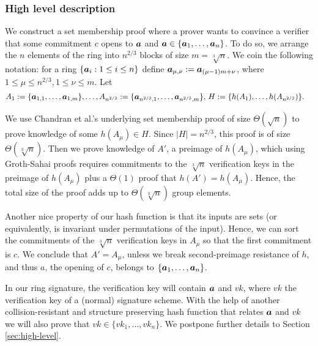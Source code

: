 \subsubsection{High level description}
We construct a set membership proof where a prover wants to convince a verifier that some commitment $c$ opens to ${\boldsymbol{a}}$ and ${\boldsymbol{a}}\in\{{\boldsymbol{a}}_1,\ldots,{\boldsymbol{a}}_n\}$. To do so, we arrange the $n$ elements of the ring into $n^{2/3}$ blocks of size $m=\sqrt[3]{n}$. We coin the following notation: for a ring $\{{\boldsymbol{a}}_i:1\leq i \leq n\}$ define ${\boldsymbol{a}}_{\mu,\nu}:={\boldsymbol{a}}_{(\mu-1)m+\nu}$, where  $1\leq\mu\leq n^{2/3},1\leq \nu\leq m$.  Let
\begin{align*}
& A_1 := \{{\boldsymbol{a}}_{1,1},\ldots,{\boldsymbol{a}}_{1,m}\},\ldots, A_{n^{2/3}} := \{{\boldsymbol{a}}_{n^{2/3},1},\ldots,{\boldsymbol{a}}_{n^{2/3},m}\},\,
H:=\{h(A_1),\ldots,\allowbreak h(A_{n^{2/3}})\}.
\end{align*}

We use Chandran et al.'s underlying set membership proof of size $\Theta(\sqrt{n})$ to prove knowledge of some $h(A_\mu)\in H$. Since $|H|=n^{2/3}$, this proof is of size $\Theta(\sqrt[3]{n})$. Then we prove knowledge of $A'$, a preimage of $h(A_\mu)$, which using Groth-Sahai proofs requires commitments to the $\sqrt[3]{n}$ verification keys in the preimage of $h(A_\mu)$ plus a $\Theta(1)$ proof that $h(A')=h(A_\mu)$. Hence, the total size of the proof adds up to $\Theta(\sqrt[3]{n})$ group elements.

Another nice property of our hash function is that its inputs are sets (or equivalently, is invariant under permutations of the input). Hence, we can sort the commitments of the $\sqrt[3]{n}$ verification keys in $A_\mu$ so that the first commitment is $c$. We conclude that $A'=A_\mu$, unless we break second-preimage resistance of $h$, and thus $a$, the opening of $c$, belongs to $\{{\boldsymbol{a}}_1,\ldots,{\boldsymbol{a}}_n\}$.

In our ring signature, the verification key will contain ${\boldsymbol{a}}$ and $vk$, where $vk$ the verification key of a (normal) signature scheme. With the help of another collision-resistant and structure preserving hash function that relates ${\boldsymbol{a}}$ and $vk$ we will also prove that $vk\in\{vk_1,\ldots,vk_n\}$. We postpone further details to Section \ref{sec:high-level}.